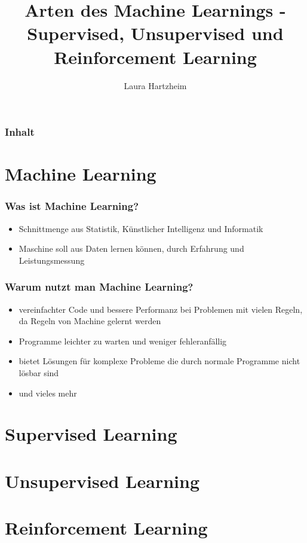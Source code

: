 \documentclass[11pt]{beamer}
\author{Laura Hartzheim}
\title{Arten des Machine Learnings - Supervised, Unsupervised und Reinforcement Learning}
\subtitle{}
\institute{}
\date{}
\begin{document}
	
	
	\begin{frame}
		\titlepage
	\end{frame} 
	
	\begin{frame}
		\frametitle{Inhalt}
		\tableofcontents
	\end{frame} 
	
	\section{Machine Learning}
	\begin{frame}
		\frametitle{Was ist Machine Learning?}
		\begin{itemize}
			\item Schnittmenge aus Statistik, Künstlicher Intelligenz und Informatik
			\item Maschine soll aus Daten lernen können, durch Erfahrung und Leistungsmessung
		\end{itemize} 
	\end{frame}
	
	\begin{frame}
		\frametitle{Warum nutzt man Machine Learning?}
		\begin{itemize}
			\item vereinfachter Code und bessere Performanz bei Problemen mit vielen Regeln, da Regeln von Machine gelernt werden 
			\item Programme leichter zu warten und weniger fehleranfällig
			\item bietet Lösungen für komplexe Probleme die durch normale Programme nicht lösbar sind
			\item und vieles mehr
			
		\end{itemize} 
	\end{frame}
	
	\section{Supervised Learning}
	
	\begin{frame}
		
	\end{frame}
	
	\section{Unsupervised Learning}
	
	\begin{frame}
		
	\end{frame}
	
	\section{Reinforcement Learning}
	
	\begin{frame}
		
	\end{frame}
	
\end{document}
